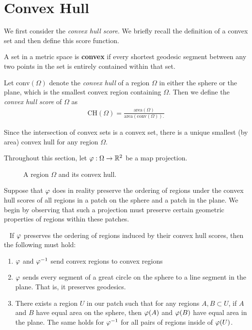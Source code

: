 \section{Convex Hull}\label{sec:ch}
We first consider the \textit{convex hull
score}.  We briefly recall the definition of a convex set and then
define this score function.


\begin{definition}
	A set in a metric space is \textbf{convex} if every shortest geodesic segment between any two points in the set is entirely 
	contained within that set.
\end{definition}





\begin{definition}
  Let $\mathrm{conv}(\Omega)$ denote the \textit{convex hull} of
  a region $\Omega$ in either the sphere or the plane, which is the
  smallest convex region containing $\Omega$.  Then we define the
  \textit{convex hull score} of $\Omega$ as 
  \begin{align*}
    \mathrm{CH}(\Omega)=
    \frac{\mathrm{area}(\Omega)}{\mathrm{area}(\mathrm{conv}(\Omega)).}
  \end{align*}
  
  Since the intersection of convex sets is a convex set, there is a unique smallest (by area) convex hull for any region $\Omega$.
\end{definition}



Throughout this section, let $\varphi:\Omega \to \mathbb{R}^2$ be a 
map projection.
\begin{figure}[htb]
	\centering
	
	\caption{A region $\Omega$ and its convex hull.}
	\label{fig:ch_example}
\end{figure}

Suppose that $\varphi$ does in reality preserve the ordering of regions under the convex hull scores of all regions in a patch on the sphere and a patch in the plane.  We begin by observing that such a projection must preserve certain geometric properties of regions within these patches.
\begin{lemma}~\label{lem:CH_prep}
	If $\varphi$ preserves the ordering of regions induced by their convex hull scores, then the following must 
	hold:
	\begin{enumerate}
		\item $\varphi$ and $\varphi^{-1}$ send convex regions to convex regions
		\item $\varphi$ sends every segment of a great circle on the sphere to a line segment in the plane.  That is, it preserves geodesics.
		\item There exists a region $U$ in our patch
		such that for any regions $A,B\subset U$, if 
		$A$ and $B$ have equal area on the sphere, then 
		$\varphi(A)$ and $\varphi(B)$ have equal area in the plane.  The same holds 
		for $\varphi^{-1}$ for all pairs of regions inside of $\varphi(U)$.
	\end{enumerate}
\end{lemma}

